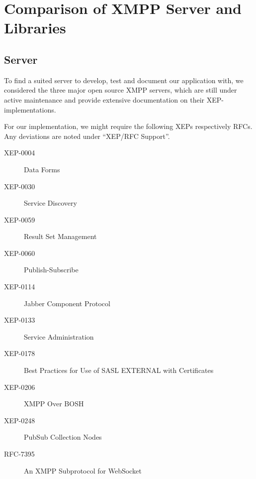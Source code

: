 \section{Comparison of XMPP Server and Libraries}\label{sec:comparison-of-xmpp-server-and-libraries}


\subsection{Server}

To find a suited server to develop, test and document our application with, we considered the three major open source XMPP servers, which are still under active maintenance and provide extensive documentation on their XEP-implementations.

For our implementation, we might require the following XEPs respectively RFCs. Any deviations are noted under ``XEP/RFC Support''.

\begin{description}
    \item[XEP-0004] Data Forms
    \item[XEP-0030] Service Discovery
    \item[XEP-0059] Result Set Management
    \item[XEP-0060] Publish-Subscribe
    \item[XEP-0114] Jabber Component Protocol
    \item[XEP-0133] Service Administration
    \item[XEP-0178] Best Practices for Use of SASL EXTERNAL with Certificates
    \item[XEP-0206] XMPP Over BOSH
    \item[XEP-0248] PubSub Collection Nodes
    \item[RFC-7395] An XMPP Subprotocol for WebSocket
\end{description}

